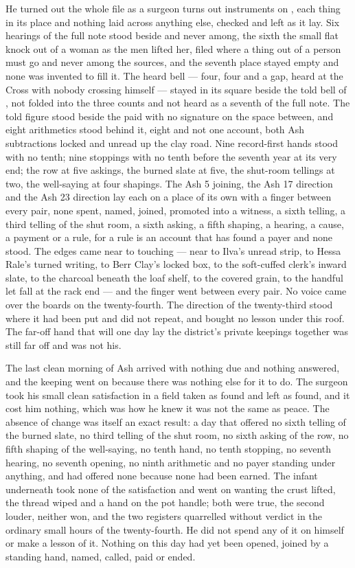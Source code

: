 He turned out the whole file as a surgeon turns out instruments on , each thing in its place and nothing laid across anything else, checked and left as it lay. Six hearings of the full note stood beside and never among, the sixth the small flat knock out of a woman as the men lifted her, filed where a thing out of a person must go and never among the sources, and the seventh place stayed empty and none was invented to fill it. The heard bell --- four, four and a gap, heard at the Cross with nobody crossing himself --- stayed in its square beside the told bell of , not folded into the three counts and not heard as a seventh of the full note. The told figure stood beside the paid with no signature on the space between, and eight arithmetics stood behind it, eight and not one account, both Ash subtractions locked and unread up the clay road. Nine record-first hands stood with no tenth; nine stoppings with no tenth before the seventh year at its very end; the row at five askings, the burned slate at five, the shut-room tellings at two, the well-saying at four shapings. The Ash 5 joining, the Ash 17 direction and the Ash 23 direction lay each on a place of its own with a finger between every pair, none spent, named, joined, promoted into a witness, a sixth telling, a third telling of the shut room, a sixth asking, a fifth shaping, a hearing, a cause, a payment or a rule, for a rule is an account that has found a payer and none stood. The edges came near to touching --- near to Ilva's unread strip, to Hessa Rale's turned writing, to Berr Clay's locked box, to the soft-cuffed clerk's inward slate, to the charcoal beneath the loaf shelf, to the covered grain, to the handful let fall at the rack end --- and the finger went between every pair. No voice came over the boards on the twenty-fourth. The direction of the twenty-third stood where it had been put and did not repeat, and bought no lesson under this roof. The far-off hand that will one day lay the district's private keepings together was still far off and was not his.

The last clean morning of Ash arrived with nothing due and nothing answered, and the keeping went on because there was nothing else for it to do. The surgeon took his small clean satisfaction in a field taken as found and left as found, and it cost him nothing, which was how he knew it was not the same as peace. The absence of change was itself an exact result: a day that offered no sixth telling of the burned slate, no third telling of the shut room, no sixth asking of the row, no fifth shaping of the well-saying, no tenth hand, no tenth stopping, no seventh hearing, no seventh opening, no ninth arithmetic and no payer standing under anything, and had offered none because none had been earned. The infant underneath took none of the satisfaction and went on wanting the crust lifted, the thread wiped and a hand on the pot handle; both were true, the second louder, neither won, and the two registers quarrelled without verdict in the ordinary small hours of the twenty-fourth. He did not spend any of it on himself or make a lesson of it. Nothing on this day had yet been opened, joined by a standing hand, named, called, paid or ended.

